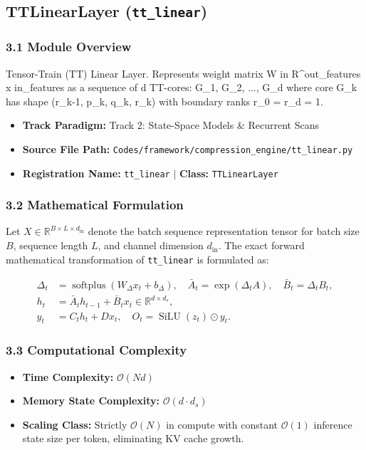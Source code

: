 \subsection{TTLinearLayer (\texttt{tt\_linear})}
\label{sec:app_module_tt\_linear}

\subsubsection*{3.1 Module Overview}
Tensor-Train (TT) Linear Layer. Represents weight matrix W in R^{out\_features x in\_features} as a sequence of d TT-cores: G\_1, G\_2, ..., G\_d where core G\_k has shape (r\_{k-1}, p\_k, q\_k, r\_k) with boundary ranks r\_0 = r\_d = 1.
\begin{itemize}
    \item \textbf{Track Paradigm:} Track 2: State-Space Models & Recurrent Scans
    \item \textbf{Source File Path:} \texttt{Codes/framework/compression\_engine/tt\_linear.py}
    \item \textbf{Registration Name:} \texttt{tt\_linear} $\mid$ \textbf{Class:} \texttt{TTLinearLayer}
\end{itemize}

\subsubsection*{3.2 Mathematical Formulation}
Let $X \in \mathbb{R}^{B \times L \times d_{\text{in}}}$ denote the batch sequence representation tensor for batch size $B$, sequence length $L$, and channel dimension $d_{\text{in}}$. The exact forward mathematical transformation of \texttt{tt\_linear} is formulated as:

\begin{align}
\Delta_t &= \operatorname{softplus}(W_\Delta x_t + b_\Delta), \quad \bar{A}_t = \exp(\Delta_t A), \quad \bar{B}_t = \Delta_t B_t, \\
h_t &= \bar{A}_t h_{t-1} + \bar{B}_t x_t \in \mathbb{R}^{d \times d_s}, \\
y_t &= C_t h_t + D x_t, \quad O_t = \operatorname{SiLU}(z_t) \odot y_t.
\end{align}


\subsubsection*{3.3 Computational Complexity}
\begin{itemize}
    \item \textbf{Time Complexity:} $\mathcal{O}(N d)$
    \item \textbf{Memory State Complexity:} $\mathcal{O}(d \cdot d_s)$
    \item \textbf{Scaling Class:} Strictly $\mathcal{O}(N)$ in compute with constant $\mathcal{O}(1)$ inference state size per token, eliminating KV cache growth.
\end{itemize}

